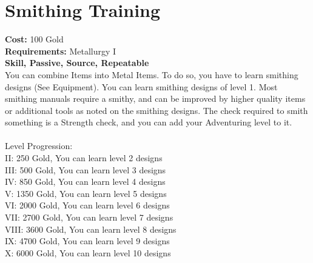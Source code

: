 \section{Smithing Training}
\textbf{Cost:} 100 Gold\\
\textbf{Requirements:} Metallurgy I\\
\textbf{Skill, Passive, Source, Repeatable}\\
You can combine Items into Metal Items. To do so, you have to learn smithing designs (See Equipment). You can learn smithing designs of level 1. Most smithing manuals require a smithy, and can be improved by higher quality items or additional tools as noted on the smithing designs. The check required to smith something is a Strength check, and you can add your Adventuring level to it.\\
\\
Level Progression:\\
II: 250 Gold, You can learn level 2 designs\\
III: 500 Gold, You can learn level 3 designs\\
IV: 850 Gold, You can learn level 4 designs\\
V: 1350 Gold, You can learn level 5 designs\\
VI: 2000 Gold, You can learn level 6 designs\\
VII: 2700 Gold, You can learn level 7 designs\\
VIII: 3600 Gold, You can learn level 8 designs\\
IX: 4700 Gold, You can learn level 9 designs\\
X: 6000 Gold, You can learn level 10 designs\\